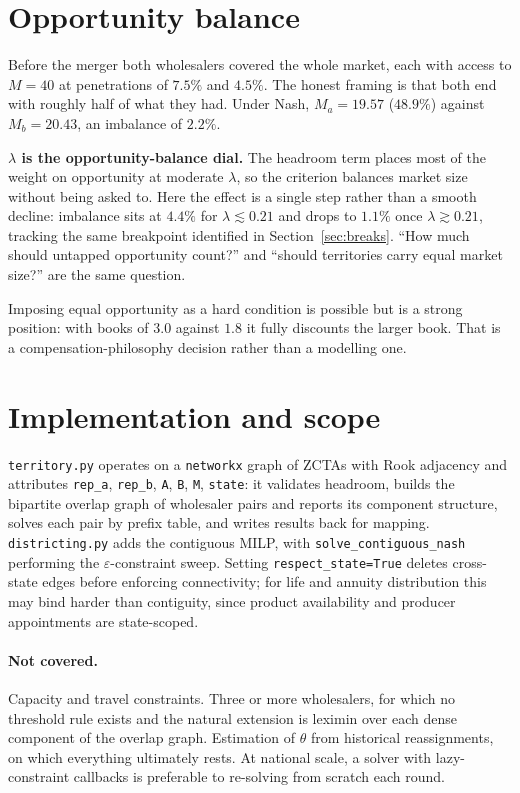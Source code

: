 \documentclass[11pt]{article}
\theoremstyle{remark}\newtheorem*{remark}{Remark}
\begin{document}
\section{Opportunity balance}\label{sec:opp}
Before the merger both wholesalers covered the whole market, each with access to
$M=40$ at penetrations of $7.5\%$ and $4.5\%$. The honest framing is that both end with
roughly half of what they had. Under Nash, $M_a=19.57$ ($48.9\%$) against $M_b=20.43$,
an imbalance of $2.2\%$.

\begin{resultbox}
\textbf{$\lambda$ is the opportunity-balance dial.} The headroom term places most of the
weight on opportunity at moderate $\lambda$, so the criterion balances market size
without being asked to. Here the effect is a single step rather than a smooth decline:
imbalance sits at $4.4\%$ for $\lambda\lesssim0.21$ and drops to $1.1\%$ once
$\lambda\gtrsim0.21$, tracking the same breakpoint identified in
Section~\ref{sec:breaks}. ``How much should untapped opportunity count?'' and ``should
territories carry equal market size?'' are the same question.
\end{resultbox}

\noindent Imposing equal opportunity as a hard condition is possible but is a strong
position: with books of $3.0$ against $1.8$ it fully discounts the larger book. That is
a compensation-philosophy decision rather than a modelling one.

\section{Implementation and scope}\label{sec:impl}
\texttt{territory.py} operates on a \texttt{networkx} graph of ZCTAs with Rook adjacency
and attributes \texttt{rep\_a}, \texttt{rep\_b}, \texttt{A}, \texttt{B}, \texttt{M},
\texttt{state}: it validates headroom, builds the bipartite overlap graph of wholesaler
pairs and reports its component structure, solves each pair by prefix table, and writes
results back for mapping. \texttt{districting.py} adds the contiguous MILP, with
\texttt{solve\_contiguous\_nash} performing the $\varepsilon$-constraint sweep. Setting
\texttt{respect\_state=True} deletes cross-state edges before enforcing connectivity;
for life and annuity distribution this may bind harder than contiguity, since product
availability and producer appointments are state-scoped.

\paragraph{Not covered.} Capacity and travel constraints. Three or more wholesalers, for
which no threshold rule exists and the natural extension is leximin over each dense
component of the overlap graph. Estimation of $\theta$ from historical reassignments,
on which everything ultimately rests. At national scale, a solver with lazy-constraint
callbacks is preferable to re-solving from scratch each round.
\end{document}
